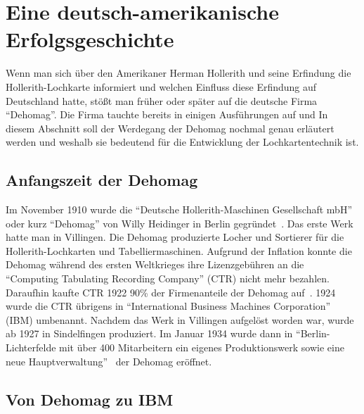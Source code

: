 \documentclass[parskip=half]{scrartcl}
\begin{document}
\section{Eine deutsch-amerikanische Erfolgsgeschichte}

Wenn man sich über den Amerikaner Herman Hollerith und seine Erfindung die
Hollerith-Lochkarte informiert und welchen Einfluss diese Erfindung auf
Deutschland hatte, stößt man früher oder später auf die deutsche Firma
\enquote{Dehomag}. Die Firma tauchte bereits in einigen Ausführungen auf und In diesem Abschnitt soll der Werdegang der Dehomag nochmal genau erläutert
werden und weshalb sie bedeutend für die Entwicklung der Lochkartentechnik
ist.

\subsection{Anfangszeit der Dehomag}

Im November 1910 wurde die \enquote{Deutsche Hollerith-Maschinen Gesellschaft
mbH} oder kurz \enquote{Dehomag} von Willy Heidinger in Berlin
gegründet~\cite{dingwerth}. Das erste Werk hatte man in Villingen. Die Dehomag
produzierte Locher und Sortierer für die Hollerith-Lochkarten und
Tabelliermaschinen. Aufgrund der Inflation konnte die Dehomag während des
ersten Weltkrieges ihre Lizenzgebühren an die \enquote{Computing Tabulating
Recording Company} (CTR) nicht mehr bezahlen.  Daraufhin kaufte CTR 1922 90\%
der Firmenanteile der Dehomag auf~\cite{restloseErfassung}. 1924 wurde die CTR
übrigens in \enquote{International Business Machines Corporation} (IBM)
umbenannt. Nachdem das Werk in Villingen aufgelöst worden war, wurde ab 1927 in
Sindelfingen produziert. Im Januar 1934 wurde dann in
\enquote{Berlin-Lichterfelde mit über 400 Mitarbeitern ein eigenes
Produktionswerk sowie eine neue Hauptverwaltung}~\cite{dingwerth} der Dehomag
eröffnet.

\subsection{Von Dehomag zu IBM}
\end{document}

